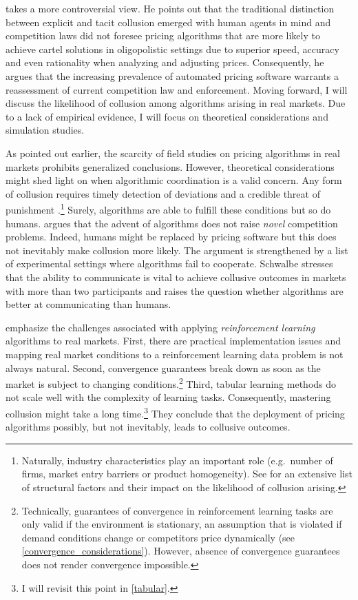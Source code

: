 \textcite{mehra_antitrust_2015} takes a more controversial view. He points out that the traditional distinction between explicit and tacit collusion emerged with human agents in mind and competition laws did not foresee pricing algorithms that are more likely to achieve cartel solutions in oligopolistic settings due to superior speed, accuracy and even rationality when analyzing and adjusting prices. Consequently, he argues that the increasing prevalence of automated pricing software warrants a reassessment of current competition law and enforcement. Moving forward, I will discuss the likelihood of collusion among algorithms arising in real markets. Due to a lack of empirical evidence, I will focus on theoretical considerations and simulation studies.

As pointed out earlier, the scarcity of field studies on pricing algorithms in real markets prohibits generalized conclusions. However, theoretical considerations might shed light on when algorithmic coordination is a valid concern. Any form of collusion requires timely detection of deviations and a credible threat of punishment \parencite[pp.48-56]{stigler_theory_1964}.\footnote{Naturally, industry characteristics play an important role (e.g.\ number of firms, market entry barriers or product homogeneity). See \textcite[p.142-149]{motta_competition_2004} for an extensive list of structural factors and their impact on the likelihood of collusion arising.}  Surely, algorithms are able to fulfill these conditions but so do humans. \textcite{schwalbe_algorithms_2018} argues that the advent of algorithms does not raise \emph{novel} competition problems. Indeed, humans might be replaced by pricing software but this does not inevitably make collusion more likely. The argument is strengthened by a list of experimental settings where algorithms fail to cooperate. Schwalbe stresses that the ability to communicate is vital to achieve collusive outcomes in markets with more than two participants and raises the question whether algorithms are better at communicating than humans.

\textcite[p.10-13]{ittoo_algorithmic_2017} emphasize the challenges associated with applying \emph{reinforcement learning} algorithms to real markets. First, there are practical implementation issues and mapping real market conditions to a reinforcement learning data problem is not always natural. Second, convergence guarantees break down as soon as the market is subject to changing conditions.\footnote{Technically, guarantees of convergence in reinforcement learning tasks are only valid if the environment is stationary, an assumption that is violated if demand conditions change or competitors price dynamically (see \autoref{convergence_considerations}). However, absence of convergence guarantees does not render convergence impossible.} Third, tabular learning methods do not scale well with the complexity of learning tasks. Consequently, mastering collusion might take a long time.\footnote{I will revisit this point in \autoref{tabular}.} They conclude that the deployment of pricing algorithms possibly, but not inevitably, leads to collusive outcomes.

